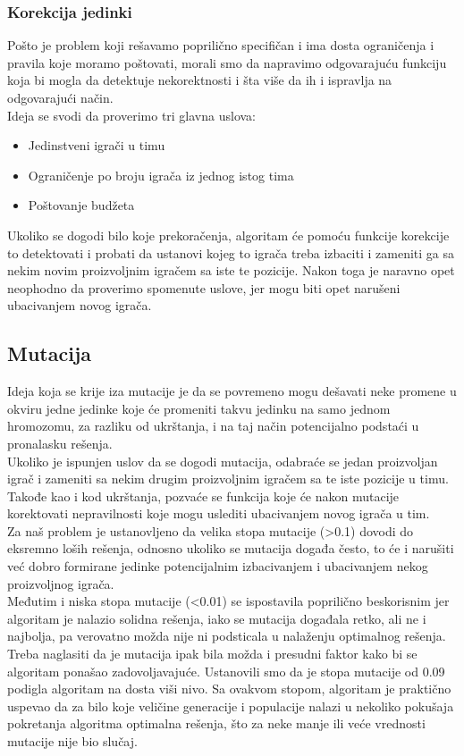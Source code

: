 \documentclass[a4paper]{article}
\begin{document}
\subsubsection{Korekcija jedinki}
Pošto je problem koji rešavamo poprilično specifičan i ima dosta ograničenja i pravila koje moramo poštovati, morali smo da napravimo odgovarajuću funkciju koja bi mogla da detektuje nekorektnosti i šta više da ih i ispravlja na odgovarajući način. \\
Ideja se svodi da proverimo tri glavna uslova:
\begin{itemize}
	\item Jedinstveni igrači u timu
	\item Ograničenje po broju igrača iz jednog istog tima
	\item Poštovanje budžeta
\end{itemize}

Ukoliko se dogodi bilo koje prekoračenja, algoritam će pomoću funkcije korekcije to detektovati i probati da ustanovi kojeg to igrača treba izbaciti i zameniti ga sa nekim novim proizvoljnim igračem sa iste te pozicije. Nakon toga je naravno opet neophodno da proverimo spomenute uslove, jer mogu biti opet narušeni ubacivanjem novog igrača.

\subsection{Mutacija}
Ideja koja se krije iza mutacije je da se povremeno mogu dešavati neke promene u okviru jedne jedinke koje će promeniti takvu jedinku na samo jednom hromozomu, za razliku od ukrštanja, i na taj način potencijalno podstaći u pronalasku rešenja. \\
Ukoliko je ispunjen uslov da se dogodi mutacija, odabraće se jedan proizvoljan igrač i zameniti sa nekim drugim proizvoljnim igračem sa te iste pozicije u timu. Takođe kao i kod ukrštanja, pozvaće se funkcija koje će nakon mutacije korektovati nepravilnosti koje mogu uslediti ubacivanjem novog igrača u tim. \\
Za naš problem je ustanovljeno da velika stopa mutacije (>0.1) dovodi do eksremno loših rešenja, odnosno ukoliko se mutacija događa često, to će i narušiti već dobro formirane jedinke potencijalnim izbacivanjem i ubacivanjem nekog proizvoljnog igrača. \\
Međutim i niska stopa mutacije (<0.01) se ispostavila poprilično beskorisnim jer algoritam je nalazio solidna rešenja, iako se mutacija događala retko, ali ne i najbolja, pa verovatno možda nije ni podsticala u nalaženju optimalnog rešenja. \\
Treba naglasiti da je mutacija ipak bila možda i presudni faktor kako bi se algoritam ponašao zadovoljavajuće. Ustanovili smo da je stopa mutacije od 0.09 podigla algoritam na dosta viši nivo. Sa ovakvom stopom, algoritam je praktično uspevao da za bilo koje veličine generacije i populacije nalazi u nekoliko pokušaja pokretanja algoritma optimalna rešenja, što za neke manje ili veće vrednosti mutacije nije bio slučaj.
\end{document}
